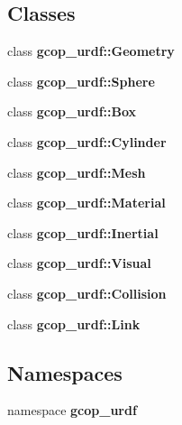 \subsection*{\-Classes}
\begin{DoxyCompactItemize}
\item 
class {\bf gcop\-\_\-urdf\-::\-Geometry}
\item 
class {\bf gcop\-\_\-urdf\-::\-Sphere}
\item 
class {\bf gcop\-\_\-urdf\-::\-Box}
\item 
class {\bf gcop\-\_\-urdf\-::\-Cylinder}
\item 
class {\bf gcop\-\_\-urdf\-::\-Mesh}
\item 
class {\bf gcop\-\_\-urdf\-::\-Material}
\item 
class {\bf gcop\-\_\-urdf\-::\-Inertial}
\item 
class {\bf gcop\-\_\-urdf\-::\-Visual}
\item 
class {\bf gcop\-\_\-urdf\-::\-Collision}
\item 
class {\bf gcop\-\_\-urdf\-::\-Link}
\end{DoxyCompactItemize}
\subsection*{\-Namespaces}
\begin{DoxyCompactItemize}
\item 
namespace {\bf gcop\-\_\-urdf}
\end{DoxyCompactItemize}
